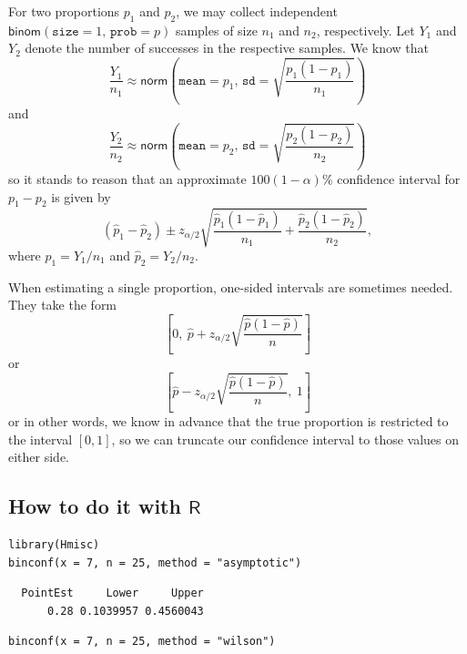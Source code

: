\documentclass[captions=tableheading]{scrbook}
\begin{document}
For two proportions \(p_{1}\) and \(p_{2}\), we may collect independent \(\mathsf{binom}(\mathtt{size}=1,\,\mathtt{prob}=p)\) samples of size \(n_{1}\) and \(n_{2}\), respectively. Let \(Y_{1}\) and \(Y_{2}\) denote the number of successes in the respective samples. 
We know that
\[
\frac{Y_{1}}{n_{1}}\approx\mathsf{norm}\left(\mathtt{mean}=p_{1},\,\mathtt{sd}=\sqrt{\frac{p_{1}(1-p_{1})}{n_{1}}}\right)
\]
and
\[
\frac{Y_{2}}{n_{2}}\approx\mathsf{norm}\left(\mathtt{mean}=p_{2},\,\mathtt{sd}=\sqrt{\frac{p_{2}(1-p_{2})}{n_{2}}}\right)
\]
so it stands to reason that an approximate \(100(1-\alpha)\%\) confidence interval for \(p_{1}-p_{2}\) is given by
\begin{equation}
\left(\hat{p}_{1}-\hat{p}_{2}\right)\pm z_{\alpha/2}\sqrt{\frac{\hat{p}_{1}(1-\hat{p}_{1})}{n_{1}}+\frac{\hat{p}_{2}(1-\hat{p}_{2})}{n_{2}}},
\end{equation}
where \(\hat{p}_{1}=Y_{1}/n_{1}\) and \(\hat{p}_{2}=Y_{2}/n_{2}\).

\begin{rem}
When estimating a single proportion, one-sided intervals are sometimes needed. They take the form
\begin{equation}
\left[0,\ \hat{p}+z_{\alpha/2}\sqrt{\frac{\hat{p}(1-\hat{p})}{n}}\right]
\end{equation}
or
\begin{equation}
\left[\hat{p}-z_{\alpha/2}\sqrt{\frac{\hat{p}(1-\hat{p})}{n}},\ 1\right]
\end{equation}
or in other words, we know in advance that the true proportion is restricted to the interval \([0,1]\), so we can truncate our confidence interval to those values on either side.
\end{rem}
\subsection{How to do it with \(\mathsf{R}\)}
\label{sec-9-4-1}



\begin{verbatim}
library(Hmisc)
binconf(x = 7, n = 25, method = "asymptotic")
\end{verbatim}

\begin{verbatim}
  PointEst     Lower     Upper
      0.28 0.1039957 0.4560043
\end{verbatim}


\begin{verbatim}
binconf(x = 7, n = 25, method = "wilson")
\end{verbatim}
\end{document}
